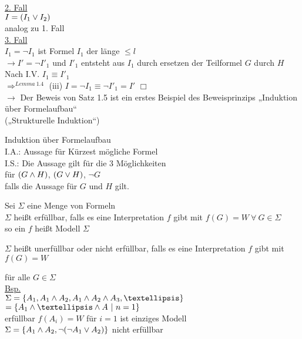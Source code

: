 \noindent
\underline{2. Fall}\\
$I = (I_1 \vee I_2)$\\
analog zu 1. Fall\\

\noindent
\underline{3. Fall}\\
$I_1 = \neg I_1$ ist Formel $I_1$ der länge $\leq l$\\
$\rightarrow I' = \neg I'_1$ und $I'_1$ entsteht aus $I_1$ durch ersetzen der Teilformel $G$ durch $H$\\

\noindent
Nach I.V. \hspace{1cm} $I_1 \equiv I'_1$\\
$\Rightarrow^{Lemma\ 1.4}$ (iii) $I = \neg I_1 \equiv \neg I'_1 = I'$ $\Box$\\
$\rightarrow$ Der Beweis von Satz 1.5 ist ein erstes Beispiel des Beweisprinzips „Induktion über Formelaufbau“\\
(„Strukturelle Induktion“)


\beweis{}
Induktion über Formelaufbau\\
I.A.: Aussage für Kürzest mögliche Formel\\
I.S.: Die Aussage gilt für die 3 Möglichkeiten\\
für $(G \wedge H)$, $(G \vee H)$, $\neg G$\\
falls die Aussage für $G$ und $H$ gilt.

Sei $\Sigma$ eine Menge von Formeln\\
$\Sigma$ heißt erfüllbar, falls es eine Interpretation $f$ gibt mit $f(G) = W\ \forall\ G \in \Sigma$\\
so ein $f$ heißt Modell $\Sigma$

\noindent
$\Sigma$ heißt unerfüllbar oder nicht erfüllbar, falls es eine Interpretation $f$ gibt mit $f(G) = W$

\noindent
für alle $G \in \Sigma$\\

\noindent
\underline{Bsp.}\\
$\Sigma = \{A_1, A_1 \AND A_2, A_1 \AND A_2 \AND A_3, … \}$\\
$= \{A_1 \AND … \AND A \ |\ n=1 \}$\\

\noindent
erfüllbar $f(A_i) = W$ für $i=1$ ist einziges Modell\\
$\Sigma = \{A_1 \wedge A_2, \neg ( \neg A_1 \vee A_2) \}$ nicht erfüllbar\\

